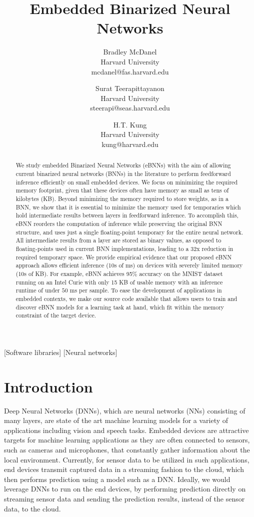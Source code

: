 \documentclass[10pt,emptycopyrightspace]{ewsn-proc}
\author{
 Bradley McDanel\\
 Harvard University\\
  mcdanel@fas.harvard.edu
 \and
 Surat Teerapittayanon\\
 Harvard University\\
 steerapi@seas.harvard.edu
 \and
 H.T. Kung\\
 Harvard University\\
 kung@harvard.edu
}
\title{Embedded Binarized Neural Networks}
\begin{document}
\maketitle

\begin{abstract}
We study embedded Binarized Neural Networks (eBNNs) with the aim of allowing current binarized neural networks (BNNs) in the literature to perform feedforward inference efficiently on small embedded devices. We focus on minimizing the required memory footprint, given that these devices often have memory as small as tens of kilobytes (KB). Beyond minimizing the memory required to store weights, as in a BNN, we show that it is essential to minimize the memory used for temporaries which hold intermediate results between layers in feedforward inference. To accomplish this, eBNN reorders the computation of inference while preserving the original BNN structure, and uses just a single floating-point temporary for the entire neural network. All intermediate results from a layer are stored as binary values, as opposed to floating-points used in current BNN implementations, leading to a 32x reduction in required temporary space. We provide empirical evidence that our proposed eBNN approach allows efficient inference (10s of ms) on devices with severely limited memory (10s of KB). For example, eBNN achieves 95\% accuracy on the MNIST dataset running on an Intel Curie with only 15 KB of usable memory with an inference runtime of under $50$ ms per sample. 
To ease the development of applications in embedded contexts, we make our source code available that allows users to train and discover eBNN models for a learning task at hand, which fit within the memory constraint of the target device.
\end{abstract}



[Software libraries]
[Neural networks]


\section{Introduction}
Deep Neural Networks (DNNs), which are neural networks (NNs) consisting of many layers, are state of the art machine learning models for a variety of applications including vision and speech tasks. Embedded devices are attractive targets for machine learning applications as they are often connected to sensors, such as cameras and microphones, that constantly gather information about the local environment. Currently, for sensor data to be utilized in such applications, end devices transmit captured data in a streaming fashion to the cloud, which then performs prediction using a model such as a DNN. Ideally, we would leverage DNNs to run on the end devices, by performing prediction directly on streaming sensor data and sending the prediction results, instead of the sensor data, to the cloud.  
\end{document}
